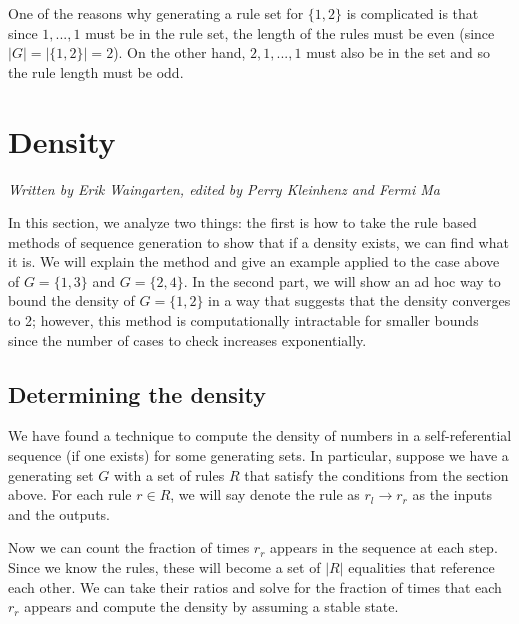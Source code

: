 \documentclass[runningheads,a4paper]{llncs}
\begin{document}
One of the reasons why generating a rule set for $\{1, 2\}$ is complicated is that since $1, ..., 1$ must be in the rule set, the length of the rules must be even (since $|G| = |\{1, 2\}| = 2$). On the other hand, $2, 1, ..., 1$ must also be in the set and so the rule length must be odd. 

\section{Density}
\label{density}
\emph{Written by Erik Waingarten, edited by Perry Kleinhenz and Fermi Ma}

In this section, we analyze two things: the first is how to take the rule based methods of sequence generation to show that if a density exists, we can find what it is. We will explain the method and give an example applied to the case above of $G = \{ 1, 3\}$ and $G = \{ 2, 4 \}$. In the second part, we will show an ad hoc way to bound the density of $G = \{ 1, 2\}$ in a way that suggests that the density converges to 2; however, this method is computationally intractable for smaller bounds since the number of cases to check increases exponentially. 

\subsection{Determining the density}

We have found a technique to compute the density of numbers in a self-referential sequence (if one exists) for some generating sets. In particular, suppose we have a generating set $G$ with a set of rules $R$ that satisfy the conditions from the section above. For each rule $r \in R$, we will say denote the rule as $r_l \rightarrow r_r$ as the inputs and the outputs. 

Now we can count the fraction of times $r_r$ appears in the sequence at each step. Since we know the rules, these will become a set of $|R|$ equalities that reference each other. We can take their ratios and solve for the fraction of times that each $r_r$ appears and compute the density by assuming a stable state.
\end{document}
